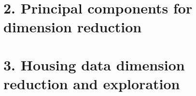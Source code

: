\documentclass[
  letterpaper,
  DIV=11,
  numbers=noendperiod]{scrartcl}
\begin{document}
\newpage

\hypertarget{principal-components-for-dimension-reduction}{%
\section{2. Principal components for dimension
reduction}\label{principal-components-for-dimension-reduction}}

\newpage

\hypertarget{housing-data-dimension-reduction-and-exploration}{%
\section{3. Housing data dimension reduction and
exploration}\label{housing-data-dimension-reduction-and-exploration}}
\end{document}
